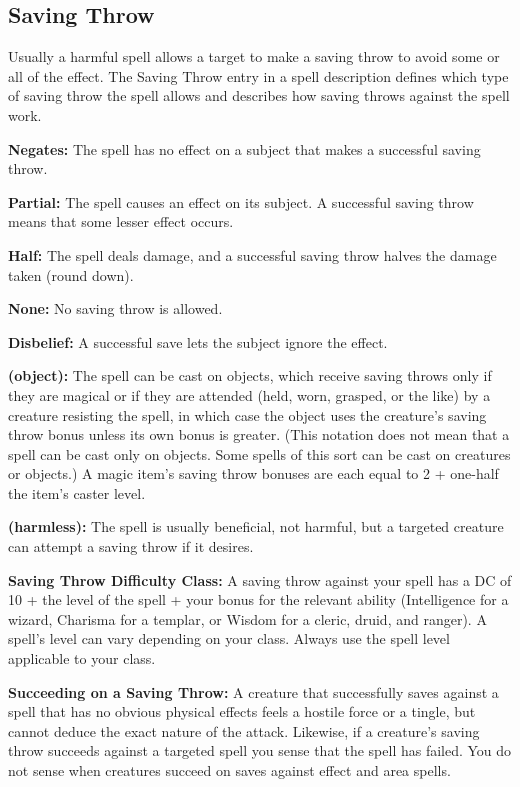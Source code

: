 \subsection{Saving Throw}
Usually a harmful spell allows a target to make a saving throw to avoid some or all of the effect. The Saving Throw entry in a spell description defines which type of saving throw the spell allows and describes how saving throws against the spell work.

\textbf{Negates:} The spell has no effect on a subject that makes a successful saving throw.

\textbf{Partial:} The spell causes an effect on its subject. A successful saving throw means that some lesser effect occurs.

\textbf{Half:} The spell deals damage, and a successful saving throw halves the damage taken (round down).

\textbf{None:} No saving throw is allowed.

\textbf{Disbelief:} A successful save lets the subject ignore the effect.

\textbf{(object):} The spell can be cast on objects, which receive saving throws only if they are magical or if they are attended (held, worn, grasped, or the like) by a creature resisting the spell, in which case the object uses the creature's saving throw bonus unless its own bonus is greater. (This notation does not mean that a spell can be cast only on objects. Some spells of this sort can be cast on creatures or objects.) A magic item's saving throw bonuses are each equal to 2 + one-half the item's caster level.

\textbf{(harmless):} The spell is usually beneficial, not harmful, but a targeted creature can attempt a saving throw if it desires.

\textbf{Saving Throw Difficulty Class:} A saving throw against your spell has a DC of 10 + the level of the spell + your bonus for the relevant ability (Intelligence for a wizard, Charisma for a templar, or Wisdom for a cleric, druid, and ranger). A spell's level can vary depending on your class. Always use the spell level applicable to your class.

\textbf{Succeeding on a Saving Throw:} A creature that successfully saves against a spell that has no obvious physical effects feels a hostile force or a tingle, but cannot deduce the exact nature of the attack. Likewise, if a creature's saving throw succeeds against a targeted spell you sense that the spell has failed. You do not sense when creatures succeed on saves against effect and area spells.


